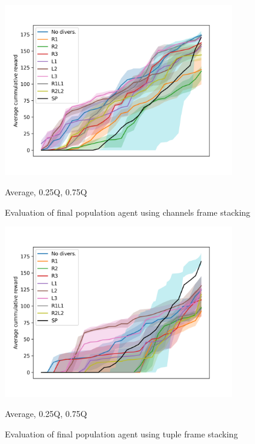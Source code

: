 \begin{figure}[!ht]
    \centering
    \includegraphics*[width=10cm]{../img/FinalPopFinalPopFsChannelsAvg.png}

    \caption{Evaluation of final population agent using channels frame stacking}
    \label{FinalPopFinalPopFsChannelsAvg}
    \medskip
    \small 

    Average, 0.25Q, 0.75Q

\end{figure}

\begin{figure}[!ht]
    \centering
    \includegraphics*[width=10cm]{../img/FinalPopFinalPopFsTupleAvg.png}

    \caption{Evaluation of final population agent using tuple frame stacking}
    \label{FinalPopFinalPopFsTupleAvg}
    \medskip
    \small 

    Average, 0.25Q, 0.75Q

\end{figure}






